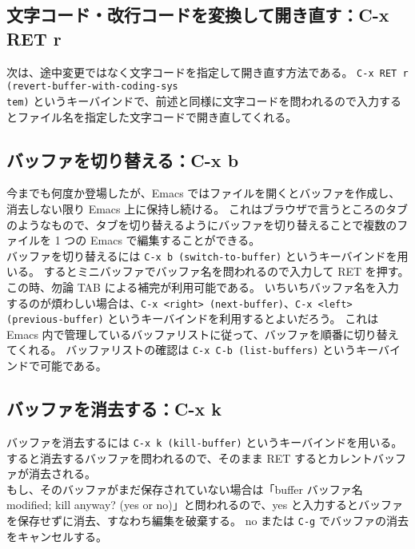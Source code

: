\subsection{文字コード・改行コードを変換して開き直す：C-x RET r}
次は、途中変更ではなく文字コードを指定して開き直す方法である。
\texttt{C-x RET r (revert-buffer-with-coding-sys\\tem)} というキーバインドで、前述と同様に文字コードを問われるので入力するとファイル名を指定した文字コードで開き直してくれる。
\subsection{バッファを切り替える：C-x b}
今までも何度か登場したが、Emacs ではファイルを開くとバッファを作成し、消去しない限り Emacs 上に保持し続ける。
これはブラウザで言うところのタブのようなもので、タブを切り替えるようにバッファを切り替えることで複数のファイルを 1 つの Emacs で編集することができる。\\

バッファを切り替えるには \texttt{C-x b (switch-to-buffer)} というキーバインドを用いる。
するとミニバッファでバッファ名を問われるので入力して RET を押す。
この時、勿論 TAB による補完が利用可能である。
いちいちバッファ名を入力するのが煩わしい場合は、\texttt{C-x <right> (next-buffer)}、\texttt{C-x <left> (previous-buffer)} というキーバインドを利用するとよいだろう。
これは Emacs 内で管理しているバッファリストに従って、バッファを順番に切り替えてくれる。
バッファリストの確認は \texttt{C-x C-b (list-buffers)} というキーバインドで可能である。
\subsection{バッファを消去する：C-x k}
バッファを消去するには \texttt{C-x k (kill-buffer)} というキーバインドを用いる。
すると消去するバッファを問われるので、そのまま RET するとカレントバッファが消去される。\\

もし、そのバッファがまだ保存されていない場合は「buffer バッファ名 modified; kill anyway? (yes or no)」と問われるので、yes と入力するとバッファを保存せずに消去、すなわち編集を破棄する。
no または \texttt{C-g} でバッファの消去をキャンセルする。

